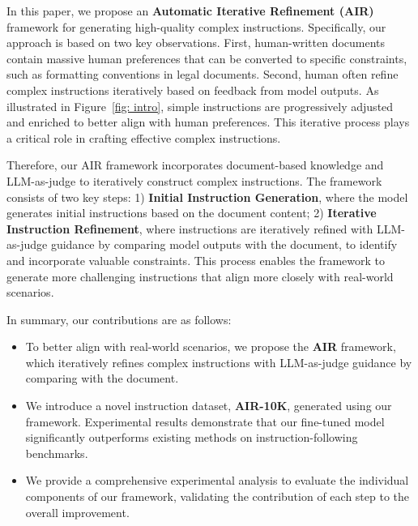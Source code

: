 In this paper, we propose an \textbf{Automatic Iterative Refinement (AIR)} framework for generating high-quality complex instructions.
Specifically, our approach is based on two key observations. First, human-written documents contain massive human preferences that can be converted to specific constraints, such as formatting conventions in legal documents. Second, human often refine complex instructions iteratively based on feedback from model outputs. As illustrated in Figure~\ref{fig: intro}, simple instructions are progressively adjusted and enriched to better align with human preferences. This iterative process plays a critical role in crafting effective complex instructions.

Therefore, our AIR framework incorporates document-based knowledge and LLM-as-judge to iteratively construct complex instructions. 
The framework consists of two key steps: 1) \textbf{Initial Instruction Generation}, where the model generates initial instructions based on the document content; 2) \textbf{Iterative Instruction Refinement}, where instructions are iteratively refined with LLM-as-judge guidance by comparing model outputs with the document, to identify and incorporate valuable constraints. This process enables the framework to generate more challenging instructions that align more closely with real-world scenarios. 

In summary, our contributions are as follows: 

\begin{itemize}[leftmargin=4mm]
    \item  To better align with real-world scenarios, we propose the \textbf{AIR} framework, which iteratively refines complex instructions with LLM-as-judge guidance by comparing with the document.

    \item We introduce a novel instruction dataset, \textbf{AIR-10K}, generated using our framework. Experimental results demonstrate that our fine-tuned model significantly outperforms existing methods on instruction-following benchmarks.

    \item We provide a comprehensive experimental analysis to evaluate the individual components of our framework, validating the contribution of each step to the overall improvement.
\end{itemize}